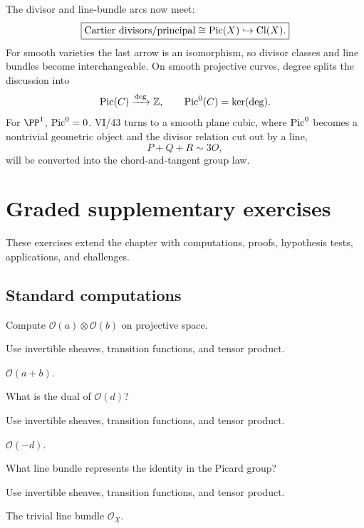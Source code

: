 The divisor and line-bundle arcs now meet:
\[
\boxed{
\text{Cartier divisors}/\text{principal}
\cong
\operatorname{Pic}(X)
\hookrightarrow
\operatorname{Cl}(X).
}
\]
For smooth varieties the last arrow is an isomorphism, so divisor classes and line bundles become interchangeable.  On smooth projective curves, degree splits the discussion into
\[
  \operatorname{Pic}(C)
  \xrightarrow{\deg}
  \mathbb Z,
  \qquad
  \operatorname{Pic}^0(C)=\ker(\deg).
\]
For \(\PP^1\), \(\operatorname{Pic}^0=0\).  VI/43 turns to a smooth plane cubic, where \(\operatorname{Pic}^0\) becomes a nontrivial geometric object and the divisor relation cut out by a line,
\[
  P+Q+R\sim 3O,
\]
will be converted into the chord-and-tangent group law.
\section{Graded supplementary exercises}
These exercises extend the chapter with computations, proofs, hypothesis tests, applications, and challenges.

\subsection*{Standard computations}

\begin{exercise}[Tensor]\label{exr:vi42-expand-01}
Compute $\mathcal O(a)\otimes\mathcal O(b)$ on projective space.
\end{exercise}
\begin{hint}
Use invertible sheaves, transition functions, and tensor product.
\end{hint}
\begin{solution}
$\mathcal O(a+b)$.
\end{solution}

\begin{exercise}[Dual]\label{exr:vi42-expand-02}
What is the dual of $\mathcal O(d)$?
\end{exercise}
\begin{hint}
Use invertible sheaves, transition functions, and tensor product.
\end{hint}
\begin{solution}
$\mathcal O(-d)$.
\end{solution}

\begin{exercise}[Identity]\label{exr:vi42-expand-03}
What line bundle represents the identity in the Picard group?
\end{exercise}
\begin{hint}
Use invertible sheaves, transition functions, and tensor product.
\end{hint}
\begin{solution}
The trivial line bundle $\mathcal O_X$.
\end{solution}

